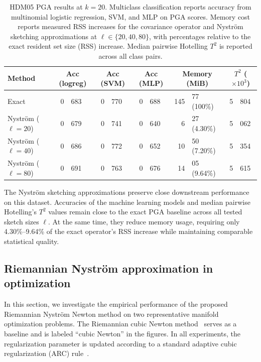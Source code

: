 \documentclass[final,onefignum,onetabnum]{siamart250211}
\begin{document}
\begin{table}[H]
\caption{HDM05 PGA results at $k=20$. Multiclass classification reports accuracy from multinomial logistic regression, SVM, and MLP on PGA scores. Memory cost reports measured RSS increases for the covariance operator and Nystr\"om sketching approximations at $\ell\in\{20,40,80\}$, with percentages relative to the exact resident set size (RSS) increase. Median pairwise Hotelling $T^2$ is reported across all class pairs.}
\label{tab:pga-hdm05}
\centering
\small
\setlength{\tabcolsep}{4pt}
\begin{tabular}{l r@{.}l r@{.}l r@{.}l r@{.}l r@{.}l}
\hline
Method & \multicolumn{2}{c}{Acc (logreg)} & \multicolumn{2}{c}{Acc (SVM)} & \multicolumn{2}{c}{Acc (MLP)} & \multicolumn{2}{c}{Memory (MiB)} & \multicolumn{2}{c}{$T^2$ ($\times 10^3$)} \\
\hline
Exact & 0&683 & 0&770 & 0&688 & 145&77 (100\%) & 5&804 \\
Nystr\"om ($\ell=20$) & 0&679 & 0&741 & 0&640 & 6&27 (4.30\%) & 5&062 \\
Nystr\"om ($\ell=40$) & 0&686 & 0&772 & 0&652 & 10&50 (7.20\%) & 5&354 \\
Nystr\"om ($\ell=80$) & 0&691 & 0&763 & 0&676 & 14&05 (9.64\%) & 5&615 \\
\hline
\end{tabular}
\end{table}

The Nystr\"om sketching approximations preserve close downstream performance on this dataset. Accuracies of the machine learning models and median pairwise Hotelling's $T^2$ values remain close to the exact PGA baseline across all tested sketch sizes $\ell$. At the same time, they reduce memory usage, requiring only 4.30\%--9.64\% of the exact operator's RSS increase while maintaining comparable statistical quality.
\subsection{Riemannian Nystr\"om approximation in optimization}
In this section, we investigate the empirical performance of the proposed Riemannian Nystr\"om Newton method on two representative manifold optimization problems.
The Riemannian cubic Newton method~\cite{zhang2018cubic} serves as a baseline and is labeled ``cubic Newton'' in the figures.
In all experiments, the regularization parameter is updated according to a standard adaptive cubic regularization (ARC) rule~\cite{cartis2011adaptive}.
\end{document}
